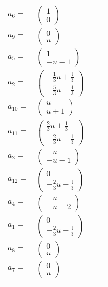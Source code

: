 \documentclass[1p]{elsarticle_modified}
\theoremstyle{definition}
\begin{document}
\begin{tabular}{m{7pt} m{180pt} m{7pt} m{180pt} }
\flushright $a_{6}=$&$\begin{pmatrix}1\\0\end{pmatrix}$ \\
\flushright $a_{9}=$&$\begin{pmatrix}0\\u\end{pmatrix}$ \\
\flushright $a_{5}=$&$\begin{pmatrix}1\\- u-1\end{pmatrix}$ \\
\flushright $a_{2}=$&$\begin{pmatrix}-\frac{1}{3} u+\frac{1}{3}\\-\frac{5}{3} u-\frac{4}{3}\end{pmatrix}$ \\
\flushright $a_{10}=$&$\begin{pmatrix}u\\u+1\end{pmatrix}$ \\
\flushright $a_{11}=$&$\begin{pmatrix}\frac{2}{3} u+\frac{1}{3}\\-\frac{2}{3} u-\frac{1}{3}\end{pmatrix}$ \\
\flushright $a_{3}=$&$\begin{pmatrix}- u\\- u-1\end{pmatrix}$ \\
\flushright $a_{12}=$&$\begin{pmatrix}0\\-\frac{2}{3} u-\frac{1}{3}\end{pmatrix}$ \\
\flushright $a_{4}=$&$\begin{pmatrix}- u\\- u-2\end{pmatrix}$ \\
\flushright $a_{1}=$&$\begin{pmatrix}0\\-\frac{2}{3} u-\frac{1}{3}\end{pmatrix}$ \\
\flushright $a_{8}=$&$\begin{pmatrix}0\\u\end{pmatrix}$ \\
\flushright $a_{7}=$&$\begin{pmatrix}0\\u\end{pmatrix}$\\&\end{tabular}
\end{document}
